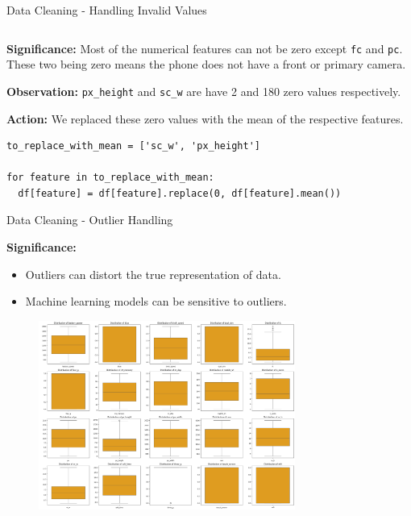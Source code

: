 \documentclass[14pt, aspectratio=169]{beamer}
\begin{document}
\begin{frame}{Data Cleaning - Handling Invalid Values}
\begin{minipage}{0.2\textwidth}
\begin{verbatim}
  \end{verbatim}
  \normalsize
\end{minipage}
\hfill
\begin{minipage}{0.6\textwidth}
  \small
  \begin{block}{}
    \textbf{Significance:} \small
    Most of the numerical features can not be zero except \texttt{fc} and \texttt{pc}. These two being zero means the phone does not have a front or primary camera.
  \end{block}
  \begin{block}{}
    \textbf{Observation:} \small
    \texttt{px\_height} and \texttt{sc\_w} are have 2 and 180 zero values respectively.
  \end{block}
  \begin{block}{}
    \textbf{Action:} \small
    We replaced these zero values with the mean of the respective features.
  \end{block}
\end{minipage}
\small
\begin{verbatim}
to_replace_with_mean = ['sc_w', 'px_height']

for feature in to_replace_with_mean:
  df[feature] = df[feature].replace(0, df[feature].mean())
\end{verbatim}
  \normalsize
\end{frame}

\begin{frame}[allowframebreaks]{Data Cleaning - Outlier Handling}
  \begin{minipage}{0.8\textwidth}
    \begin{block}{}
      \textbf{Significance:} \small
      \begin{itemize}
        \item Outliers can distort the true representation of data.
        \item Machine learning models can be sensitive to outliers.
      \end{itemize}
    \end{block}
  \end{minipage}
  \begin{figure}[H]
    \centering
    \includegraphics[width=0.75\textwidth]{../report/box_plots_before.png}
  \end{figure}
\end{frame}
\end{document}
